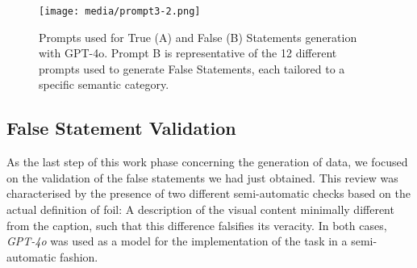 \begin{figure*}[h]
    \small
  \texttt{[image: media/prompt3-2.png]}
  \caption{Prompts used for True (A) and False (B) Statements generation with GPT-4o. Prompt B is representative of the 12 different prompts used to generate False Statements, each tailored to a specific semantic category.}
  \label{fig:Prompt_StatementGen}
\end{figure*}

\subsection{False Statement Validation}
\label{subsec:FoilVal}

As the last step of this work phase concerning the generation of data, we focused on the validation of the false statements we had just obtained. This review was characterised by the presence of two different semi-automatic checks based on the actual definition of foil: A description of the visual content minimally different from the caption, such that this difference falsifies its veracity. In both cases, \textit{GPT-4o} was used as a model for the implementation of the task in a semi-automatic fashion.
